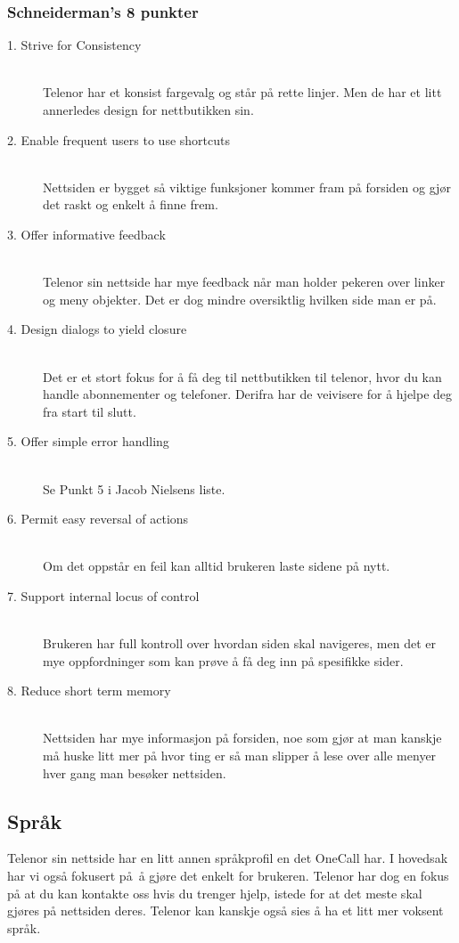 \documentclass[a4paper, 10pt]{article}
\begin{document}
\subsubsection*{Schneiderman's 8 punkter}

\begin{description}
  \item[1. Strive for Consistency] \hfill \\
    Telenor har et konsist fargevalg og står på rette linjer. Men de har et litt annerledes design for nettbutikken sin.
  \item[2. Enable frequent users to use shortcuts] \hfill \\
    Nettsiden er bygget så viktige funksjoner kommer fram på forsiden og gjør det raskt og enkelt å finne frem.
  \item[3. Offer informative feedback] \hfill \\
    Telenor sin nettside har mye feedback når man holder pekeren over linker og meny objekter. Det er dog mindre oversiktlig hvilken side man er på.
  \item[4. Design dialogs to yield closure] \hfill \\
    Det er et stort fokus for å få deg til nettbutikken til telenor, hvor du kan handle abonnementer og telefoner. Derifra har de veivisere for å hjelpe deg fra start til slutt.
  \item[5. Offer simple error handling] \hfill \\
    Se Punkt 5 i Jacob Nielsens liste.
  \item[6. Permit easy reversal of actions] \hfill \\
    Om det oppstår en feil kan alltid brukeren laste sidene på nytt.  
  \item[7. Support internal locus of control] \hfill \\
    Brukeren har full kontroll over hvordan siden skal navigeres, men det er mye oppfordninger som kan prøve å få deg inn på spesifikke sider.
  \item[8. Reduce short term memory] \hfill \\
    Nettsiden har mye informasjon på forsiden, noe som gjør at man kanskje må huske litt mer på hvor ting er så man slipper å lese over alle menyer hver gang man besøker nettsiden.
\end{description}

\subsection*{Språk}
Telenor sin nettside har en litt annen språkprofil en det OneCall har. I hovedsak har vi også fokusert på å gjøre det enkelt for brukeren. Telenor har dog en fokus på at du kan kontakte oss hvis du trenger hjelp, istede for at det meste skal gjøres på nettsiden deres. Telenor kan kanskje også sies å ha et litt mer voksent språk.
\end{document}
